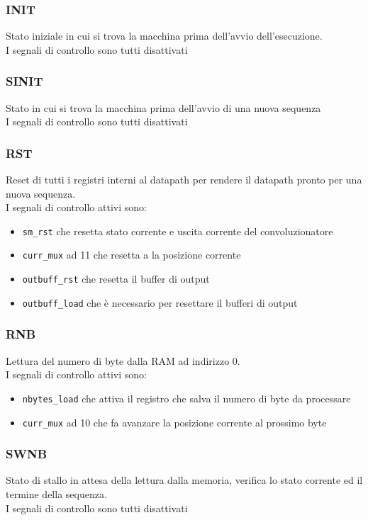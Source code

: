 \documentclass[12pt, a4paper]{article}
\begin{document}
\subsubsection{INIT}
Stato iniziale in cui si trova la macchina prima dell'avvio dell'esecuzione.\\
I segnali di controllo sono tutti disattivati

\subsubsection{SINIT}
Stato in cui si trova la macchina prima dell'avvio di una nuova sequenza\\
I segnali di controllo sono tutti disattivati

\pagebreak

\subsubsection{RST}
Reset di tutti i registri interni al datapath per rendere il datapath pronto per
una nuova sequenza.\\
I segnali di controllo attivi sono:
\begin{itemize}
    \item \texttt{sm\_rst} che resetta stato corrente e uscita corrente del convoluzionatore
    \item \texttt{curr\_mux} ad 11 che resetta a la posizione corrente
    \item \texttt{outbuff\_rst} che resetta il buffer di output
    \item \texttt{outbuff\_load} che è necessario per resettare il bufferi di output
\end{itemize}

\subsubsection{RNB}
Lettura del numero di byte dalla RAM ad indirizzo 0.\\
I segnali di controllo attivi sono:
\begin{itemize}
    \item \texttt{nbytes\_load} che attiva il registro che salva il numero di byte da processare
    \item \texttt{curr\_mux} ad 10 che fa avanzare la posizione corrente al prossimo byte
\end{itemize}

\subsubsection{SWNB}
Stato di stallo in attesa della lettura dalla memoria, verifica lo stato corrente ed il termine della sequenza.\\
I segnali di controllo sono tutti disattivati
\end{document}
